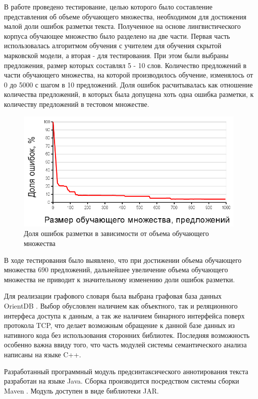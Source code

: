 В работе проведено тестирование, целью которого было составление представления об объеме обучающего множества, необходимом для достижения малой доли ошибок разметки текста. Полученное на основе лингвистического корпуса обучающее множество было разделено на две части. Первая часть использовалась алгоритмом обучения с учителем для обучения скрытой марковской модели, а вторая - для тестирования. При этом были выбраны предложения, размер которых составлял 5 - 10 слов. Количество предложений в части обучающего множества, на которой производилось обучение, изменялось от 0 до 5000 с шагом в 10 предложений. Доля ошибок расчитывалась как отношение количества предложений, в которых была допущена хоть одна ошибка разметки, к количеству предложений в тестовом множестве.
\begin{figure}[H]
	\centering
	\includegraphics[scale=0.5]{img/test_chart.png}
	\caption{Доля ошибок разметки в зависимости от объема обучающего множества}
\end{figure}
В ходе тестирования было выявлено, что при достижении объема обучающего множества 690 предложений, дальнейшее увеличение объема обучающего множества не приводит к значительному изменению доли ошибок разметки.

Для реализации графового словаря была выбрана графовая база данных OrientDB \cite{web.orient}. Выбор обусловлен наличием как объектного, так и реляционного интерфеса доступа к данным, а так же наличием бинарного интерфейса поверх протокола TCP, что делает возможным обращение к данной базе данных из нативного кода без использования сторонних библиотек. Последняя возможность особенно важна ввиду того, что часть модулей системы семантического анализа написаны на языке C++.

Разработанный программный модуль предсинтаксического аннотирования текста разработан на языке Java. Сборка производится посредством системы сборки Maven \cite{maven}. Модуль доступен в виде библиотеки JAR.

